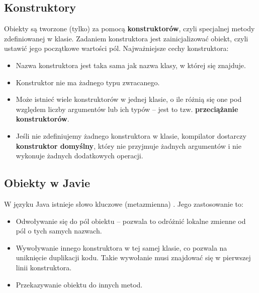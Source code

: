 \subsection{Konstruktory}
Obiekty są tworzone (tylko) za pomocą \textbf{konstruktorów}, czyli specjalnej metody zdefiniowanej w klasie. Zadaniem konstruktora jest zainicjalizować obiekt, czyli ustawić jego początkowe wartości pól. Najważniejsze cechy konstruktora:
\begin{itemize}
    \item Nazwa konstruktora jest taka sama jak nazwa klasy, w której się znajduje.
    \item Konstruktor nie ma żadnego typu zwracanego.
    \item Może istnieć wiele konstruktorów w jednej klasie, o ile różnią się one pod względem liczby argumentów lub ich typów -- jest to tzw. \textbf{przeciążanie konstruktorów}.
    \item Jeśli nie zdefiniujemy żadnego konstruktora w klasie, kompilator dostarczy \textbf{konstruktor domyślny}, który nie przyjmuje żadnych argumentów i nie wykonuje żadnych dodatkowych operacji.
\end{itemize}

\subsection{Obiekty w Javie}
W języku Java istnieje słowo kluczowe (metazmienna) . Jego zastosowanie to:
\begin{itemize}
    \item Odwoływanie się do pól obiektu -- pozwala to odróżnić lokalne zmienne od pól o tych samych nazwach.
    \item Wywoływanie innego konstruktora w tej samej klasie, co pozwala na uniknięcie duplikacji kodu. Takie wywołanie musi znajdować się w pierwszej linii konstruktora.
    \item Przekazywanie obiektu do innych metod.
\end{itemize}



